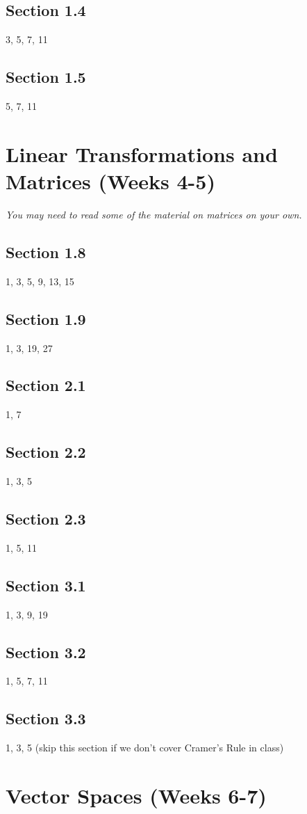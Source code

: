 \documentclass{amsart}
\begin{document}
\subsection*{Section 1.4} 3, 5, 7, 11
\subsection*{Section 1.5} 5, 7, 11


\section{Linear Transformations and Matrices (Weeks 4-5)}

\textit{You may need to read some of the material on matrices on your own.}

\subsection*{Section 1.8} 1, 3, 5, 9, 13, 15
\subsection*{Section 1.9} 1, 3, 19, 27
\subsection*{Section 2.1} 1, 7
\subsection*{Section 2.2} 1, 3, 5
\subsection*{Section 2.3} 1, 5, 11
\subsection*{Section 3.1} 1, 3, 9, 19
\subsection*{Section 3.2} 1, 5, 7, 11
\subsection*{Section 3.3} 1, 3, 5 (skip this section if we don't cover Cramer's Rule in class)


\section{Vector Spaces (Weeks 6-7)}
\end{document}
